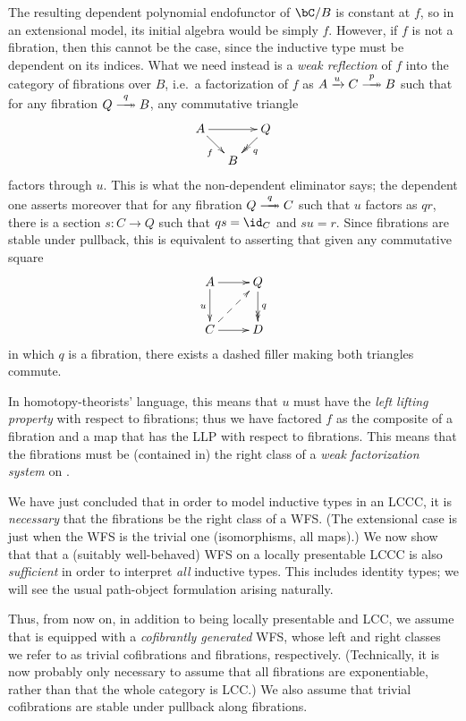 \documentclass{amsart}
\begin{document}
The resulting dependent polynomial endofunctor of $\bC/B$ is constant at $f$, so in an extensional model, its initial algebra would be simply $f$.
However, if $f$ is not a fibration, then this cannot be the case, since the inductive type must be dependent on its indices.
What we need instead is a \emph{weak reflection} of $f$ into the category of fibrations over $B$, i.e.\ a factorization of $f$ as $A \xto{u} C \xfib{p} B$ such that for any fibration $Q \xfib{q} B$, any commutative triangle
\[ \xymatrix@-1pc{ A \ar[rr] \ar[dr]_f && Q \ar@{->>}[dl]^q\\ & B }\] 
factors through $u$.
This is what the non-dependent eliminator says; the dependent one asserts moreover that for any fibration $Q \xfib{q} C$ such that $u$ factors as $q r$, there is a section $s\colon C\to Q$ such that $q s = \id_C$ and $s u = r$.
Since fibrations are stable under pullback, this is equivalent to asserting that given any commutative square
\[ \xymatrix{ A \ar[d]_u \ar[r] & Q \ar@{->>}[d]^q \\ C \ar@{-->}[ur] \ar[r] & D } \]
in which $q$ is a fibration, there exists a dashed filler making both triangles commute.

In homotopy-theorists' language, this means that $u$ must have the \emph{left lifting property} with respect to fibrations; thus we have factored $f$ as the composite of a fibration and a map that has the LLP with respect to fibrations.
This means that the fibrations must be (contained in) the right class of a \emph{weak factorization system} on \bC.

We have just concluded that in order to model inductive types in an LCCC, it is \emph{necessary} that the fibrations be the right class of a WFS.
(The extensional case is just when the WFS is the trivial one (isomorphisms, all maps).)
We now show that that a (suitably well-behaved) WFS on a locally presentable LCCC is also \emph{sufficient} in order to interpret \emph{all} inductive types.
This includes identity types; we will see the usual path-object formulation arising naturally.

Thus, from now on, in addition to being locally presentable and LCC, we assume that \bC is equipped with a \emph{cofibrantly generated} WFS, whose left and right classes we refer to as trivial cofibrations and fibrations, respectively.
(Technically, it is now probably only necessary to assume that all fibrations are exponentiable, rather than that the whole category is LCC.)
We also assume  that trivial cofibrations are stable under pullback along fibrations.
\end{document}
